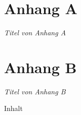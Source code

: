 \begin{appendices}
    \chapter*{Anhang A}
    \noindent \textit{Titel von Anhang A}
    


    \chapter*{Anhang B}
    \noindent \textit{Titel von Anhang B}

    Inhalt
\end{appendices}





